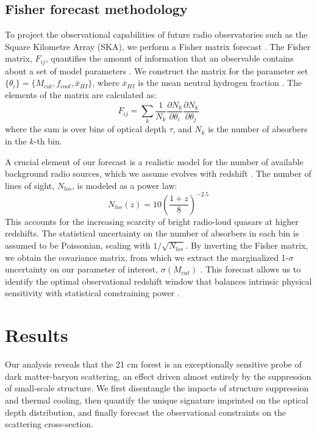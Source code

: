 \documentclass[]{article}
\begin{document}
\subsection{Fisher forecast methodology}

To project the observational capabilities of future radio observatories such as the Square Kilometre Array (SKA), we perform a Fisher matrix forecast \citep{Ewall_Wice_2016,Berti_2023,Balu_2023,Mason_2023}. The Fisher matrix, $F_{ij}$, quantifies the amount of information that an observable contains about a set of model parameters \citep{Mason_2023,Balu_2023,Ewall_Wice_2016,Alves_2017,sarkar2017fishermatrixbasedpredictions}. We construct the matrix for the parameter set $\{\theta_i\} = \{M_{cut}, f_{cool}, \bar{x}_{HI}\}$, where $\bar{x}_{HI}$ is the mean neutral hydrogen fraction \citep{Balu_2023,Mason_2023,Ewall_Wice_2016,zhang2025constrainingneutralhydrogenfraction}. The elements of the matrix are calculated as:
\begin{equation}
F_{ij} = \sum_{k} \frac{1}{N_k} \frac{\partial N_k}{\partial \theta_i} \frac{\partial N_k}{\partial \theta_j}
\end{equation}
where the sum is over bins of optical depth $\tau$, and $N_k$ is the number of absorbers in the $k$-th bin.\citep{Mallik_2024,2021}

A crucial element of our forecast is a realistic model for the number of available background radio sources, which we assume evolves with redshift \citep{Haiman_2004,massardi2010modelcosmologicalevolutionlow,Smol_i__2017,gao2024empiricalmodelextragalacticradio}. The number of lines of sight, $N_{los}$, is modeled as a power law:
\begin{equation}
N_{los}(z) = 10 \left( \frac{1+z}{8} \right)^{-2.5}
\end{equation}
This accounts for the increasing scarcity of bright radio-loud quasars at higher redshifts. The statistical uncertainty on the number of absorbers in each bin is assumed to be Poissonian, scaling with $1/\sqrt{N_{los}}$. By inverting the Fisher matrix, we obtain the covariance matrix, from which we extract the marginalized 1-$\sigma$ uncertainty on our parameter of interest, $\sigma(M_{cut})$ \citep{Porter_2015}. This forecast allows us to identify the optimal observational redshift window that balances intrinsic physical sensitivity with statistical constraining power \citep{wolfson2023forecastingconstraintshighzigm}.

\section{Results}
\label{sec:results}
Our analysis reveals that the 21 cm forest is an exceptionally sensitive probe of dark matter-baryon scattering, an effect driven almost entirely by the suppression of small-scale structure. We first disentangle the impacts of structure suppression and thermal cooling, then quantify the unique signature imprinted on the optical depth distribution, and finally forecast the observational constraints on the scattering cross-section.
\end{document}
